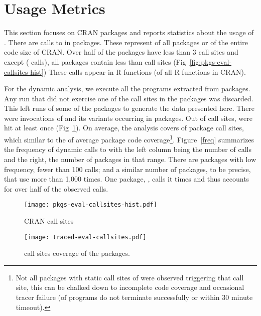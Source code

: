 \documentclass[screen,acmsmall]{acmart}
\begin{document}
\newpage

\section{Usage Metrics}

This section focuses on CRAN packages and reports statistics about the usage of
\eval. There are \PkgEvalCallSites calls to \eval in \PkgPackages packages.
These represent \PkgPackagesRatio of all packages or \PkgCodeRatio of the
entire code size of CRAN. Over half of the packages have less than 3 \eval
call sites and except \MaxEvalCallSitesPackage (\MaxEvalCallSitesCount \eval
calls), all packages contain less than \MaxEvalCallSitesRest \eval call sites
(\cf Fig~\ref{fig:pkgs-eval-callsites-hist}) These \eval calls appear in
\PkgFunsWithEval R functions (\CranFunsWithEvalRatio of all R functions in
CRAN).

For the dynamic analysis, we execute all the \CranRunnableScripts programs
extracted from \CranPackages packages. Any run that did not exercise one of the
\eval call sites in the packages was discarded. This left \Nbruns runs of some
of the \Corpus packages to generate the data presented here. There were
\Allcalls invocations of \eval and its variants occurring in \Triggeredpkgs
packages. Out of \PkgEvalCallSitesRnd \eval call sites, \PkgHitEvalCallSites
were hit at least once (\cf Fig~\ref{fig:traced-eval-callsites}). On average,
the analysis covers \PkgHitEvalCallSitesAvgRatio of package \eval call sites,
which similar to the \PkgCodeCoverage of average package code
coverage\footnote{Not all packages with static call sites of \eval were
observed triggering that call site, this can be chalked down to incomplete code
coverage and occasional tracer failure (\PkgFailedProgramsRatio of programs do
not terminate successfully or within 30 minute timeout).}.  Figure~\ref{freq}
summarizes the frequency of dynamic calls to \eval with the left column being
the number of calls and the right, the number of packages in that range. There
are \Fewcalls packages with low \eval frequency, fewer than 100 calls; and a
similar number of packages, \Manycalls to be precise, that use \eval more than
1,000 times.  One package, \Maxcallspack, calls it \Maxcalls times and thus
accounts for over half of the observed calls.

\begin{figure}[t]
\begin{minipage}{.3\textwidth}
  \vspace*{14mm}
  \hspace*{-10mm}
  \texttt{[image: pkgs-eval-callsites-hist.pdf]} \caption{CRAN
  \eval call sites}%
  \label{fig:pkgs-eval-callsites-hist}
\end{minipage}
\begin{minipage}{.6\textwidth}
  \centering
  \texttt{[image: traced-eval-callsites.pdf]}
  \caption{\eval call sites coverage of the \PkgPackages packages.}%
  \label{fig:traced-eval-callsites}
\end{minipage}
\end{figure}
\end{document}
